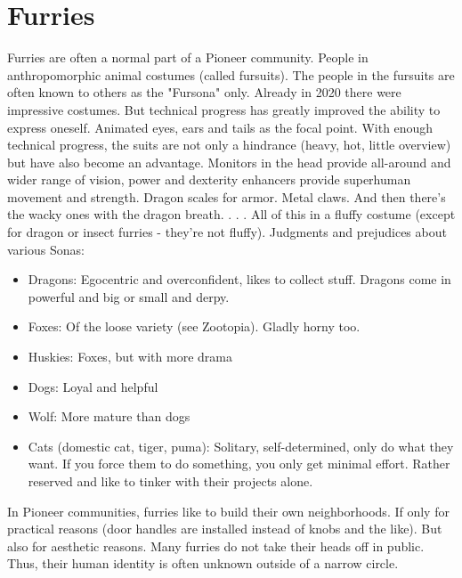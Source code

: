 \section{Furries}
Furries are often a normal part of a Pioneer community. People in anthropomorphic animal costumes (called fursuits). The people in the fursuits are often known to others as the "Fursona" only.
Already in 2020 there were impressive costumes. But technical progress has greatly improved the ability to express oneself. Animated eyes, ears and tails as the focal point.
With enough technical progress, the suits are not only a hindrance (heavy, hot, little overview) but have also become an advantage. Monitors in the head provide all-around and wider range of vision, power and dexterity enhancers provide superhuman movement and strength. Dragon scales for armor. Metal claws. And then there's the wacky ones with the dragon breath. . . .
All of this in a fluffy costume (except for dragon or insect furries - they're not fluffy).
Judgments and prejudices about various Sonas:

\begin{itemize}
    \item Dragons: Egocentric and overconfident, likes to collect stuff. Dragons come in powerful and big or small and derpy.
    \item Foxes: Of the loose variety (see Zootopia). Gladly horny too.
    \item Huskies: Foxes, but with more drama
    \item Dogs: Loyal and helpful
    \item Wolf: More mature than dogs
    \item Cats (domestic cat, tiger, puma): Solitary, self-determined, only do what they want. If you force them to do something, you only get minimal effort. Rather reserved and like to tinker with their projects alone.
\end{itemize}

In Pioneer communities, furries like to build their own neighborhoods. If only for practical reasons (door handles are installed instead of knobs and the like). But also for aesthetic reasons.
Many furries do not take their heads off in public. Thus, their human identity is often unknown outside of a narrow circle.